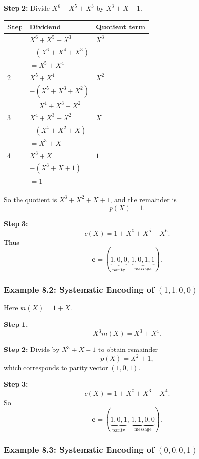 \documentclass[11pt,oneside]{book}
\theoremstyle{plain}
\theoremstyle{definition}
\theoremstyle{remark}
\begin{document}
\textbf{Step 2:} Divide \(X^6+X^5+X^3\) by \(X^3+X+1\).

\begin{longtable}[]{@{}lll@{}}
\toprule\noalign{}
Step & Dividend & Quotient term \\
\midrule\noalign{}
\endhead
\bottomrule\noalign{}
\endlastfoot
1 & \(X^6 + X^5 + X^3\) & \(X^3\) \\
& \(-(X^6 + X^4 + X^3)\) & \\
& \(= X^5 + X^4\) & \\
2 & \(X^5 + X^4\) & \(X^2\) \\
& \(-(X^5 + X^3 + X^2)\) & \\
& \(= X^4 + X^3 + X^2\) & \\
3 & \(X^4 + X^3 + X^2\) & \(X\) \\
& \(-(X^4 + X^2 + X)\) & \\
& \(= X^3 + X\) & \\
4 & \(X^3 + X\) & \(1\) \\
& \(-(X^3 + X + 1)\) & \\
& \(= 1\) & \\
\end{longtable}

So the quotient is \(X^3+X^2+X+1\), and the remainder is \[p(X)=1.\]

\textbf{Step 3:} \[c(X)=1+X^3+X^5+X^6.\] Thus
\[\mathbf{c}=(\underbrace{1,0,0}_{\text{parity}},\ \underbrace{1,0,1,1}_{\text{message}}).\]

\subsubsection{\texorpdfstring{Example 8.2: Systematic Encoding of
\((1,1,0,0)\)}{Example 8.2: Systematic Encoding of (1,1,0,0)}}\label{example-8.2-systematic-encoding-of-1100}

Here \(m(X)=1+X\).

\textbf{Step 1:} \[X^3m(X)=X^3+X^4.\]

\textbf{Step 2:} Divide by \(X^3+X+1\) to obtain remainder
\[p(X)=X^2+1,\] which corresponds to parity vector \((1,0,1)\).

\textbf{Step 3:} \[c(X)=1+X^2+X^3+X^4.\] So
\[\mathbf{c}=(\underbrace{1,0,1}_{\text{parity}},\ \underbrace{1,1,0,0}_{\text{message}}).\]

\subsubsection{\texorpdfstring{Example 8.3: Systematic Encoding of
\((0,0,0,1)\)}{Example 8.3: Systematic Encoding of (0,0,0,1)}}\label{example-8.3-systematic-encoding-of-0001}
\end{document}
